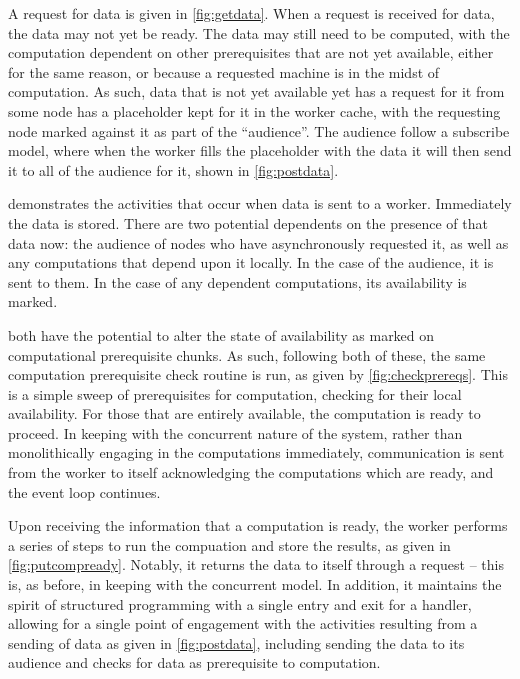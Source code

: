 
A request for data is given in \cref{fig:getdata}.
When a request is received for data, the data may not yet be ready.
The data may still need to be computed, with the computation dependent on other prerequisites that are not yet available, either for the same reason, or because a requested machine is in the midst of computation.
As such, data that is not yet available yet has a request for it from some node has a placeholder kept for it in the worker cache, with the requesting node marked against it as part of the ``audience''.
The audience follow a subscribe model, where when the worker fills the placeholder with the data it will then send it to all of the audience for it, shown in \cref{fig:postdata}.


 demonstrates the activities that occur when data is sent to a worker.
Immediately the data is stored.
There are two potential dependents on the presence of that data now: the audience of nodes who have asynchronously requested it, as well as any computations that depend upon it locally.
In the case of the audience, it is sent to them.
In the case of any dependent computations, its availability is marked.


 both have the potential to alter the state of availability as marked on computational prerequisite chunks.
As such, following both of these, the same computation prerequisite check routine is run, as given by \cref{fig:checkprereqs}.
This is a simple sweep of prerequisites for computation, checking for their local availability.
For those that are entirely available, the computation is ready to proceed.
In keeping with the concurrent nature of the system, rather than monolithically engaging in the computations immediately, communication is sent from the worker to itself acknowledging the computations which are ready, and the event loop continues.


Upon receiving the information that a computation is ready, the worker performs a series of steps to run the compuation and store the results, as given in \cref{fig:putcompready}.
Notably, it returns the data to itself through a request -- this is, as before, in keeping with the concurrent model.
In addition, it maintains the spirit of structured programming with a single entry and exit for a handler, allowing for a single point of engagement with the activities resulting from a sending of data as given in \cref{fig:postdata}, including sending the data to its audience and checks for data as prerequisite to computation.

